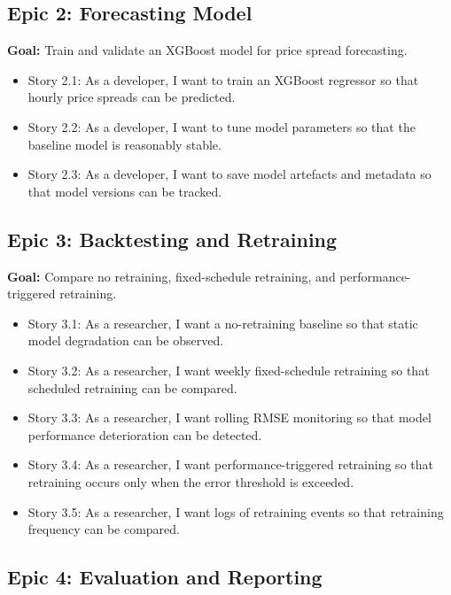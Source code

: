 \documentclass[12pt,a4paper]{article}
\begin{document}
\subsection{Epic 2: Forecasting Model}

\textbf{Goal:} Train and validate an XGBoost model for price spread forecasting.

\begin{itemize}
    \item Story 2.1: As a developer, I want to train an XGBoost regressor so that hourly price spreads can be predicted.
    \item Story 2.2: As a developer, I want to tune model parameters so that the baseline model is reasonably stable.
    \item Story 2.3: As a developer, I want to save model artefacts and metadata so that model versions can be tracked.
\end{itemize}

\subsection{Epic 3: Backtesting and Retraining}

\textbf{Goal:} Compare no retraining, fixed-schedule retraining, and performance-triggered retraining.

\begin{itemize}
    \item Story 3.1: As a researcher, I want a no-retraining baseline so that static model degradation can be observed.
    \item Story 3.2: As a researcher, I want weekly fixed-schedule retraining so that scheduled retraining can be compared.
    \item Story 3.3: As a researcher, I want rolling RMSE monitoring so that model performance deterioration can be detected.
    \item Story 3.4: As a researcher, I want performance-triggered retraining so that retraining occurs only when the error threshold is exceeded.
    \item Story 3.5: As a researcher, I want logs of retraining events so that retraining frequency can be compared.
\end{itemize}

\subsection{Epic 4: Evaluation and Reporting}
\end{document}
